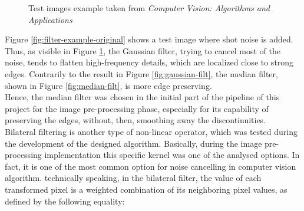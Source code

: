 \begin{figure}[t]
	\centering
\caption{Test images example taken from \textit{Computer Vision: Algorithms and Applications} \cite{Szeliski2011}}
\label{fig:filter-image-example}
\end{figure}

Figure \ref{fig:filter-example-original} shows a test image where shot noise is added.
Thus, as visible in Figure \ref{fig:filter-image-example}, the Gaussian filter, trying to cancel most of the noise, tends to flatten high-frequency details, which are localized close to strong edges.
Contrarily to the result in Figure \ref{fig:gaussian-filt}, the median filter, shown in Figure \ref{fig:median-filt}, is more edge preserving.\\
Hence, the median filter was chosen in the initial part of the pipeline of this project for the image pre-processing phase, especially for its capability of preserving the edges, without, then, smoothing away the discontinuities.\\
Bilateral filtering is another type of non-linear operator, which was tested during the development of the designed algorithm.
Basically, during the image pre-processing implementation this specific kernel was one of the analysed options.
In fact, it is one of the most common option for noise cancelling in computer vision algorithm.
technically speaking, in the bilateral filter, the value of each transformed pixel is a weighted combination of its neighboring pixel values, as defined by the following equality:

